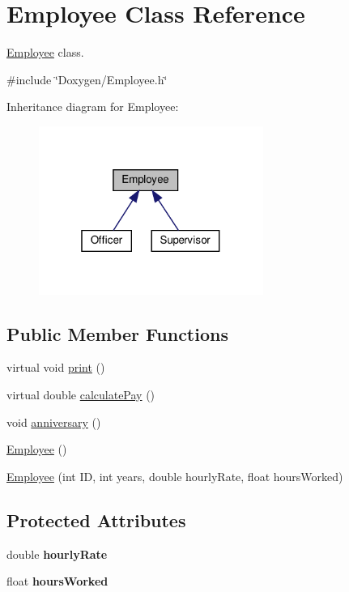 \hypertarget{classEmployee}{}\section{Employee Class Reference}
\label{classEmployee}


\hyperlink{classEmployee}{Employee} class.  




{\ttfamily \#include \char`\"{}Doxygen/\+Employee.\+h\char`\"{}}



Inheritance diagram for Employee\+:
\nopagebreak
\begin{figure}[H]
\begin{center}
\leavevmode
\includegraphics[width=208pt]{classEmployee__inherit__graph}
\end{center}
\end{figure}
\subsection*{Public Member Functions}
\begin{DoxyCompactItemize}
\item 
virtual void \hyperlink{classEmployee_a79556ad700627dba88049f487a34a762}{print} ()
\item 
virtual double \hyperlink{classEmployee_a01c2c44e15434237db28832f6972e960}{calculate\+Pay} ()
\item 
void \hyperlink{classEmployee_a67c345031cf63f515fb09dc675dee5f3}{anniversary} ()
\item 
\hyperlink{classEmployee_a003c7bd08c40924e381eb0750cbb906f}{Employee} ()
\item 
\hyperlink{classEmployee_ad0c935ef9a290a82dcf7865172c90148}{Employee} (int ID, int years, double hourly\+Rate, float hours\+Worked)
\end{DoxyCompactItemize}
\subsection*{Protected Attributes}
\begin{DoxyCompactItemize}
\item 
\mbox{\label{classEmployee_ac31134abb9b4004fc015e51ef579b069}} 
double {\bfseries hourly\+Rate}
\item 
\mbox{\label{classEmployee_afde35c73d02eb1cfe89e23a80998b42e}} 
float {\bfseries hours\+Worked}
\end{DoxyCompactItemize}
